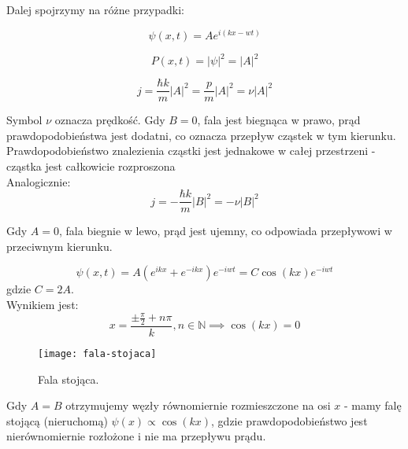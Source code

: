 Dalej spojrzymy na różne przypadki: \\


\begin{equation*}
    \psi(x, t) = A e^{i(kx - wt)}
\end{equation*}

\begin{equation*}
    P(x, t) = \left| \psi \right|^2 = \left| A \right|^2
\end{equation*}

\begin{equation*}
    j = \frac{\hbar k}{m} \left| A \right|^2 = \frac{p}{m} \left| A \right|^2 = \nu \left| A \right|^2
\end{equation*}

Symbol $\nu$ oznacza prędkość. Gdy $B=0$, fala jest biegnąca w prawo, prąd prawdopodobieństwa jest dodatni, co oznacza przepływ
cząstek w tym kierunku. Prawdopodobieństwo znalezienia cząstki jest jednakowe w całej przestrzeni - cząstka jest całkowicie rozproszona \\

Analogicznie:
\begin{equation*}
    j = - \frac{\hbar k}{m} \left| B \right|^2 = - \nu \left| B \right|^2
\end{equation*}

Gdy $A=0$, fala biegnie w lewo, prąd jest ujemny, co odpowiada przepływowi w przeciwnym kierunku. \\

\newpage
{}

\begin{equation*}
    \psi(x, t) = A \left( e^{ikx} + e^{-ikx} \right) e^{-i w t} = C \cos(kx) e^{-i w t}
\end{equation*}
gdzie $C = 2A$. \\
Wynikiem jest:
\begin{equation*}
    x = \frac{\pm \frac{\pi}{2} + n \pi}{k}, n \in \mathbb{N} \implies \cos(kx) = 0
\end{equation*}

\begin{figure}[H]
    \centering
    \texttt{[image: fala-stojaca]}
    \caption{Fala stojąca.}
    \label{fig:fala-stojaca}
\end{figure}

Gdy $A=B$ otrzymujemy węzły równomiernie rozmieszczone na osi $x$ - mamy falę stojącą (nieruchomą)
$\psi(x) \propto \cos(kx)$, gdzie prawdopodobieństwo jest nierównomiernie rozłożone i nie ma przepływu prądu. \\

